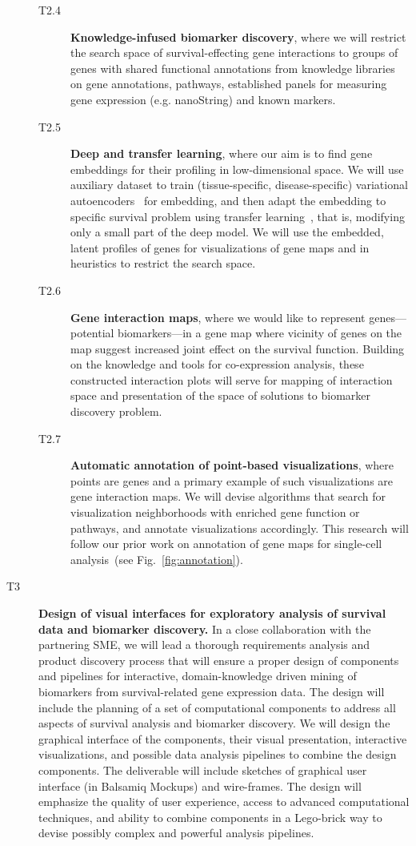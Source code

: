 \documentclass[11pt,a4paper]{article}
\renewcommand{\bold}{\textbf}
\begin{document}
\begin{description}
\begin{description}
		\item[T2.4] \bold{Knowledge-infused biomarker discovery}, where we will restrict the search space of survival-effecting gene interactions to groups of genes with shared functional annotations from knowledge libraries on gene annotations, pathways, established panels for measuring gene expression (e.g. nanoString) and known markers.
 		\item[T2.5] \bold{Deep and transfer learning}, where our aim is to find gene embeddings for their profiling in low-dimensional space. We will use auxiliary dataset to train (tissue-specific, disease-specific) variational autoencoders~\cite{doersch2021tutorial} for embedding, and then adapt the embedding to specific survival problem using transfer learning~\cite{Godec2019}, that is, modifying only a small part of the deep model. We will use the embedded, latent profiles of genes for visualizations of gene maps and in heuristics to restrict the search space.
 		\item[T2.6] \bold{Gene interaction maps}, where we would like to represent genes---potential biomarkers---in a gene map where vicinity of genes on the map suggest increased joint effect on the survival function. Building on the knowledge and tools for co-expression analysis, these constructed interaction plots will serve for mapping of interaction space and presentation of the space of solutions to biomarker discovery problem.
		\item[T2.7] \bold{Automatic annotation of point-based visualizations}, where points are genes and a primary example of such visualizations are gene interaction maps. We will devise algorithms that search for visualization neighborhoods with enriched gene function or pathways, and annotate visualizations accordingly. This research will follow our prior work on annotation of gene maps for single-cell analysis~(see Fig.~\ref{fig:annotation}).
	\end{description}
	\item[T3] \bold{Design of visual interfaces for exploratory analysis of survival data and biomarker discovery.} In a close collaboration with the partnering SME, we will lead a thorough requirements analysis and product discovery process that will ensure a proper design of components and pipelines for interactive, domain-knowledge driven mining of biomarkers from survival-related gene expression data. The design will include the planning of a set of computational components to address all aspects of survival analysis and biomarker discovery. We will design the graphical interface of the components, their visual presentation, interactive visualizations, and possible data analysis pipelines to combine the design components. The deliverable will include sketches of graphical user interface (in Balsamiq Mockups) and wire-frames. The design will emphasize the quality of user experience, access to advanced computational techniques, and ability to combine components in a Lego-brick way to devise possibly complex and powerful analysis pipelines.

\end{description}
\end{document}
